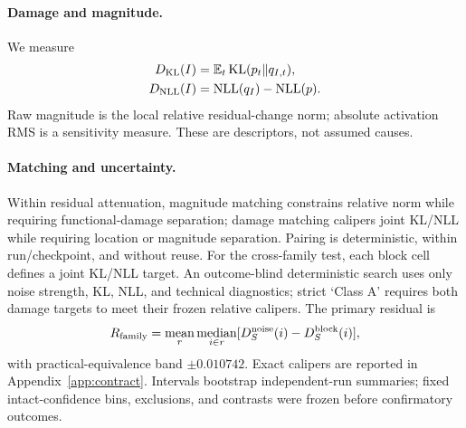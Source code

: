 \paragraph{Damage and magnitude.}
We measure
\begin{align}
 D_{\rm KL}(I)&=\mathbb{E}_t\,\mathrm{KL}(p_t\Vert q_{I,t}),\\
 D_{\rm NLL}(I)&=\mathrm{NLL}(q_I)-\mathrm{NLL}(p).
\end{align}
Raw magnitude is the local relative residual-change norm; absolute activation
RMS is a sensitivity measure. These are descriptors, not assumed causes.

\paragraph{Matching and uncertainty.}
Within residual attenuation, magnitude matching constrains relative norm while
requiring functional-damage separation; damage matching calipers joint KL/NLL
while requiring location or magnitude separation. Pairing is deterministic,
within run/checkpoint, and without reuse. For the cross-family test, each block
cell defines a joint KL/NLL target. An outcome-blind deterministic search uses
only noise strength, KL, NLL, and technical diagnostics; strict `Class A'
requires both damage targets to meet their frozen relative calipers. The
primary residual is
\begin{equation}
 R_{\rm family}=\operatorname*{mean}_{r}
 \operatorname*{median}_{i\in r}[D_S^{\rm noise}(i)-D_S^{\rm block}(i)],
\end{equation}
with practical-equivalence band $\pm0.010742$. Exact calipers are reported in
Appendix~\ref{app:contract}. Intervals bootstrap independent-run summaries;
fixed intact-confidence bins, exclusions, and contrasts were frozen before
confirmatory outcomes.
